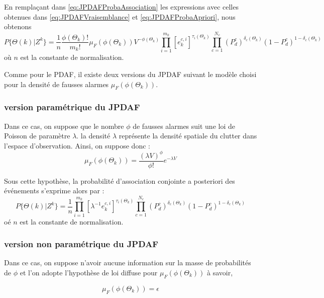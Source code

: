 \documentclass[10pt,french,a4paper]{report}
\begin{document}
 	  En remplaçant dans \ref{eq:JPDAFProbaAssociation} les expressions avec celles obtenues dans \ref{eq:JPDAFVraisemblance} et \ref{eq:JPDAFProbaApriori}, nous obtenons 
 	  	 \begin{equation}
 	   \label{eq:JPDAFProbaApriori}
 P\{\Theta(k) | Z^{k} \}= \frac{1}{n}\frac{ \phi(\Theta_k)! }{m_k!}\mu_F(\phi(\Theta_k)) V^{- \phi(\Theta_k) }  \prod_{i=1}^{m_k}   {[e_k^{c,i}]}^ {\tau_i(\Theta_k)} \prod _{c=1}^{N_c} (P_d^c)^{\delta_c(\Theta_k)}(1-P_d^c)^{1 - \delta_c(\Theta_k)}
 	  \end{equation}  
 	  où $n$ est la constante de normalisation. 
 	  
 	  Comme pour le \ac{PDAF}, il existe deux versions du \ac{JPDAF} suivant le modèle choisi pour la densité de fausses alarmes $\mu_F(\phi(\Theta_k))$. 
 	  
 	  \subsubsection{version paramétrique du \ac{JPDAF}}
 	  Dans ce cas, on suppose que le nombre $\phi$ de fausses alarmes suit une loi de Poisson de paramètre $\lambda$. la densité $\lambda$ représente la densité spatiale du clutter dans l'espace d'observation. Ainsi, on suppose donc :
 	  	 \begin{equation}
\mu_F(\phi(\Theta_k)) = \frac{{(\lambda V )}^{\phi}}{\phi!} e^{-\lambda V}
 	  \end{equation}  

Sous cette hypothèse, la probabilité d'association conjointe a posteriori des événements s'exprime alors par :
 	  	 \begin{equation}
 P\{\Theta(k) | Z^{k} \}= \frac{1}{n} \prod_{i=1}^{m_k}   {[\lambda^{-1} e_k^{c,i}]}^ {\tau_i(\Theta_k)} \prod _{c=1}^{N_c} (P_d^c)^{\delta_c(\Theta_k)}(1-P_d^c)^{1 - \delta_c(\Theta_k)}
 	  \end{equation}  
 	  oé $n$ est la constante de normalisation. 
 	  
 	   	  \subsubsection{version non paramétrique du \ac{JPDAF}}
 	   	  
 	   	  Dans ce cas, on suppose n'avoir aucune information sur la masse de probabilités de $\phi$ et l'on adopte
l'hypothèse de loi diffuse pour $\mu_F(\phi(\Theta_k))$ à savoir,

	 \begin{equation}
\mu_F(\phi(\Theta_k)) = \epsilon
 	  \end{equation}  
 	  
\end{document}
